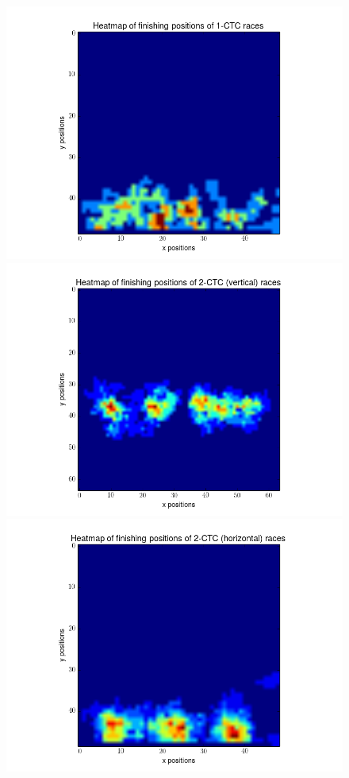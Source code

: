 \documentclass[12pt]{article}
\begin{document}
\begin{figure}[h]
	\centering
	\includegraphics[scale=0.40]{img/1CTCfinal}
	\includegraphics[scale=0.40]{img/2CTCv-final}
	\includegraphics[scale=0.40]{img/2CTChorzfinal}

\end{figure}
\end{document}
